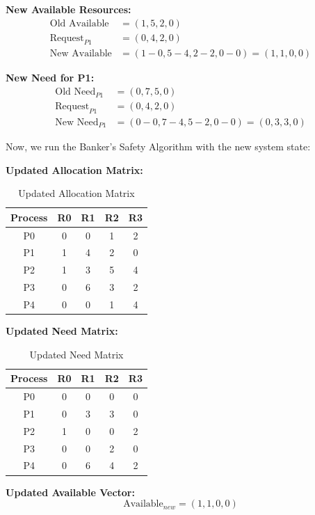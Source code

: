 \documentclass[../main.tex]{subfiles}
\begin{document}
\textbf{New Available Resources:}
\[
\begin{aligned}
\text{Old Available} &= (1, 5, 2, 0) \\
\text{Request}_{P1} &= (0, 4, 2, 0) \\
\text{New Available} &= (1-0, 5-4, 2-2, 0-0) = (1, 1, 0, 0)
\end{aligned}
\]

\textbf{New Need for P1:}
\[
\begin{aligned}
\text{Old Need}_{P1} &= (0, 7, 5, 0) \\
\text{Request}_{P1} &= (0, 4, 2, 0) \\
\text{New Need}_{P1} &= (0-0, 7-4, 5-2, 0-0) = (0, 3, 3, 0)
\end{aligned}
\]

\medskip

Now, we run the Banker's Safety Algorithm with the new system state:

\textbf{Updated Allocation Matrix:}

\begin{table}[h!]
\centering
\begin{tabular}{|c|cccc|}
\hline
Process & R0 & R1 & R2 & R3 \\
\hline
P0 & 0 & 0 & 1 & 2 \\
P1 & 1 & 4 & 2 & 0 \\
P2 & 1 & 3 & 5 & 4 \\
P3 & 0 & 6 & 3 & 2 \\
P4 & 0 & 0 & 1 & 4 \\
\hline
\end{tabular}
\caption{Updated Allocation Matrix}
\end{table}

\textbf{Updated Need Matrix:}

\begin{table}[h!]
\centering
\begin{tabular}{|c|cccc|}
\hline
Process & R0 & R1 & R2 & R3 \\
\hline
P0 & 0 & 0 & 0 & 0 \\
P1 & 0 & 3 & 3 & 0 \\
P2 & 1 & 0 & 0 & 2 \\
P3 & 0 & 0 & 2 & 0 \\
P4 & 0 & 6 & 4 & 2 \\
\hline
\end{tabular}
\caption{Updated Need Matrix}
\end{table}

\textbf{Updated Available Vector:}
\[
\text{Available}_{new} = (1, 1, 0, 0)
\]
\end{document}
